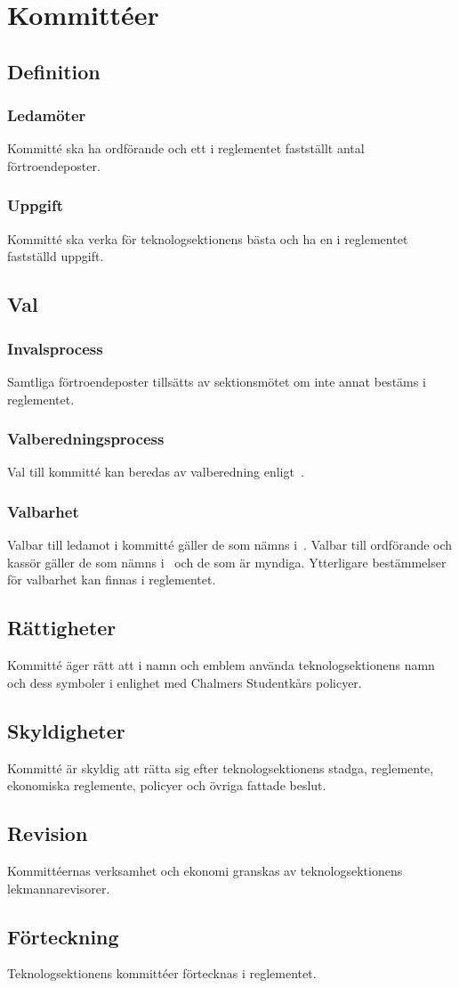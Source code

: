 \section{Kommittéer}
\subsection{Definition}
\subsubsection{Ledamöter}
Kommitté ska ha ordförande och ett i reglementet fastställt antal förtroendeposter.

\subsubsection{Uppgift}
Kommitté ska verka för teknologsektionens bästa och ha en i reglementet fastställd uppgift.

\subsection{Val}
\subsubsection{Invalsprocess}
Samtliga förtroendeposter tillsätts av sektionsmötet om inte annat bestäms i reglementet.
\subsubsection{Valberedningsprocess}
Val till kommitté kan beredas av valberedning enligt~.

\subsubsection{Valbarhet}
Valbar till ledamot i kommitté gäller de som nämns i~.
Valbar till ordförande och kassör gäller de som nämns i~ och de som är myndiga.
Ytterligare bestämmelser för valbarhet kan finnas i reglementet.

\subsection{Rättigheter}
Kommitté äger rätt att i namn och emblem använda teknologsektionens namn och dess symboler i enlighet med Chalmers Studentkårs policyer.
\subsection{Skyldigheter}
Kommitté är skyldig att rätta sig efter teknologsektionens stadga, reglemente, ekonomiska reglemente, policyer och övriga fattade beslut.
\subsection{Revision}
Kommittéernas verksamhet och ekonomi granskas av teknologsektionens lekmannarevisorer.
\subsection{Förteckning}
Teknologsektionens kommittéer förtecknas i reglementet.
